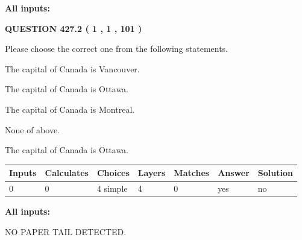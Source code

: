 \documentclass[12pt]{article}
\begin{document}
   
   
   
\noindent\vspace{0.1in}\hspace{-0.08in} {\textbf{\Large{All inputs: }}}
   
   
  
\vspace{0.2in}
  
{\textbf{\Large{QUESTION
427.2 
 ( 1 , 1 , 101 )
}}}
  
  
Please choose the correct one from the following statements.
 
 
The capital of Canada is Vancouver.
 
 
The capital of Canada is Ottawa.
 
 
The capital of Canada is Montreal.
 
 
 None of above.
 
 
\noindent{}
 
 
The capital of Canada is Ottawa.
 
 
\noindent{}
 
 
   
   
   
   
\noindent\begin{tabular}{|l|l|l|l|l|l|l|}
 \hline
Inputs & Calculates & Choices & Layers & Matches & Answer & Solution \\ \hline
 0  & 
 0  & 
 4
  simple  
  & 
 4  & 
 0  & 
  yes & 
  no 
  \\ \hline
 \end{tabular}
   
   
   
   
\noindent{}
   
   
   
   
\noindent\vspace{0.1in}\hspace{-0.08in} {\textbf{\Large{All inputs: }}}
   
   
   
   
\vspace{2.0in} NO PAPER TAIL DETECTED.
   
   
   
\end{document}
